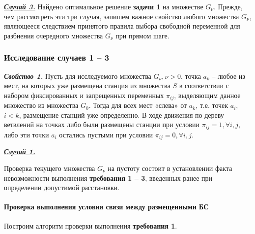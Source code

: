 \underline{\textit{\textbf{Случай 3.}}} Найдено оптимальное решение \textbf{задачи 1} на множестве $G_\nu$.
Прежде, чем рассмотреть эти три случая, запишем важное свойство любого множества $G_\nu$, являющееся следствием принятого правила выбора свободной переменной для разбиения очередного множества $G_\nu$ при прямом шаге. 



\subsubsection{Исследование случаев 1 – 3}

\textit{\textbf{Свойство 1.}} Пусть для исследуемого множества $G_\nu, \nu > 0$, точка $a_k$ -- любое из мест, на которых уже размещена станция из множества $S$ в соответствии с набором фиксированных и запрещенных переменных $\pi_{ij}$, выделяющим данное множество из множества $G_0$. Тогда для всех мест «слева» от $a_k$, т.е. точек $a_i$, $i<k$, размещение станций уже определенно. В ходе движения по дереву ветвлений на точках  либо были размещены станции при условии $\pi_{ij} =1 , \forall i, j$, либо эти точки $a_i$ остались пустыми при условии $\pi_{ij} =0 , \forall i, j$.

\underline{\textit{\textbf{Случай 1.}}}

Проверка текущего множества $G_\nu$ на пустоту состоит в установлении факта невозможности выполнения \textbf{требования 1 -- 3}, введенных ранее при определении допустимой расстановки.




\paragraph{Проверка выполнения условия связи между размещенными БС}

Построим алгоритм проверки выполнения \textbf{требования 1}.



